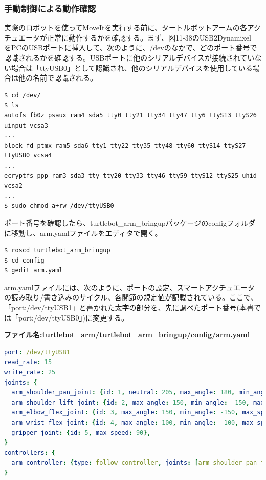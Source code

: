 \subsubsection{手動制御による動作確認}

実際のロボットを使ってMoveItを実行する前に、タートルボットアームの各アクチュエータが正常に動作するかを確認する。まず、図11-38のUSB2Dynamixel\\をPCのUSBポートに挿入して、次のように、/devのなかで、どのポート番号で認識されるかを確認する。USBポートに他のシリアルデバイスが接続されていない場合は「ttyUSB0」として認識され、他のシリアルデバイスを使用している場合は他の名前で認識される。

\begin{lstlisting}[language=ROS]
$ cd /dev/
$ ls
autofs fb0z psaux ram4 sda5 tty0 tty21 tty34 tty47 tty6 ttyS13 ttyS26 uinput vcsa3
...
block fd ptmx ram5 sda6 tty1 tty22 tty35 tty48 tty60 ttyS14 ttyS27 ttyUSB0 vcsa4
...
ecryptfs ppp ram3 sda3 tty tty20 tty33 tty46 tty59 ttyS12 ttyS25 uhid vcsa2
...
$ sudo chmod a+rw /dev/ttyUSB0
\end{lstlisting}

ポート番号を確認したら、turtlebot\_arm\_bringupパッケージのconfigフォルダに移動し、arm.yamlファイルをエディタで開く。

\begin{lstlisting}[language=ROS]
$ roscd turtlebot_arm_bringup
$ cd config
$ gedit arm.yaml
\end{lstlisting}

arm.yamlファイルには、次のように、ポートの設定、スマートアクチュエータの読み取り/書き込みのサイクル、各関節の規定値が記載されている。ここで、「port:/dev/ttyUSB1」と書かれた太字の部分を、先に調べたポート番号(本書では「port:/dev/ttyUSB0」)に変更する。

\textbf{ファイル名:turtlebot\_arm/turtlebot\_arm\_bringup/config/arm.yaml}
\begin{lstlisting}[language=YAML]
port: /dev/ttyUSB1
read_rate: 15
write_rate: 25
joints: {
  arm_shoulder_pan_joint: {id: 1, neutral: 205, max_angle: 180, min_angle: -60, max_speed: 90},
  arm_shoulder_lift_joint: {id: 2, max_angle: 150, min_angle: -150, max_speed: 90},
  arm_elbow_flex_joint: {id: 3, max_angle: 150, min_angle: -150, max_speed: 90},
  arm_wrist_flex_joint: {id: 4, max_angle: 100, min_angle: -100, max_speed: 90},
  gripper_joint: {id: 5, max_speed: 90},
}
controllers: {
  arm_controller: {type: follow_controller, joints: [arm_shoulder_pan_joint, arm_shoulder_lift_joint, arm_elbow_flex_joint, arm_wrist_flex_joint], action_name: arm_controller/follow_joint_trajectory, onboard: False }
}
\end{lstlisting}

